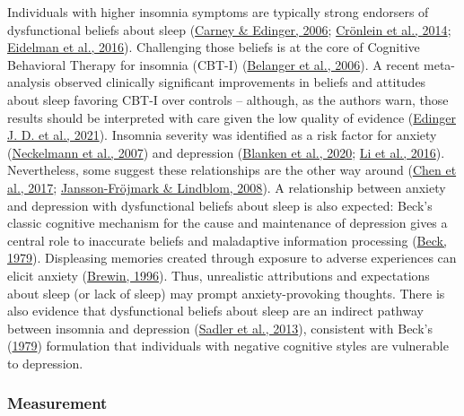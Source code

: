 \documentclass[
  ,doc,11pt, twoside,floatsintext]{apa6}
\begin{document}
Individuals with higher insomnia symptoms are typically strong endorsers of dysfunctional beliefs about sleep (\protect\hyperlink{ref-carney2006}{Carney \& Edinger, 2006}; \protect\hyperlink{ref-cronlein2014}{Crönlein et al., 2014}; \protect\hyperlink{ref-eidelman2016}{Eidelman et al., 2016}). Challenging those beliefs is at the core of Cognitive Behavioral Therapy for insomnia (CBT-I) (\protect\hyperlink{ref-belanger2006}{Belanger et al., 2006}). A recent meta-analysis observed clinically significant improvements in beliefs and attitudes about sleep favoring CBT-I over controls -- although, as the authors warn, those results should be interpreted with care given the low quality of evidence (\protect\hyperlink{ref-edingerjackd.2021}{Edinger J. D. et al., 2021}). Insomnia severity was identified as a risk factor for anxiety (\protect\hyperlink{ref-neckelmann2007}{Neckelmann et al., 2007}) and depression (\protect\hyperlink{ref-blanken2020}{Blanken et al., 2020}; \protect\hyperlink{ref-li2016}{Li et al., 2016}). Nevertheless, some suggest these relationships are the other way around (\protect\hyperlink{ref-chen2017}{Chen et al., 2017}; \protect\hyperlink{ref-jansson-frojmark2008b}{Jansson-Fröjmark \& Lindblom, 2008}). A relationship between anxiety and depression with dysfunctional beliefs about sleep is also expected: Beck's classic cognitive mechanism for the cause and maintenance of depression gives a central role to inaccurate beliefs and maladaptive information processing (\protect\hyperlink{ref-beck1979cognitive}{Beck, 1979}). Displeasing memories created through exposure to adverse experiences can elicit anxiety (\protect\hyperlink{ref-brewin1996theoretical}{Brewin, 1996}). Thus, unrealistic attributions and expectations about sleep (or lack of sleep) may prompt anxiety-provoking thoughts. There is also evidence that dysfunctional beliefs about sleep are an indirect pathway between insomnia and depression (\protect\hyperlink{ref-sadler2013}{Sadler et al., 2013}), consistent with Beck's (\protect\hyperlink{ref-beck1979cognitive}{1979}) formulation that individuals with negative cognitive styles are vulnerable to depression.

\hypertarget{measurement}{%
\subsubsection{Measurement}\label{measurement}}
\end{document}
